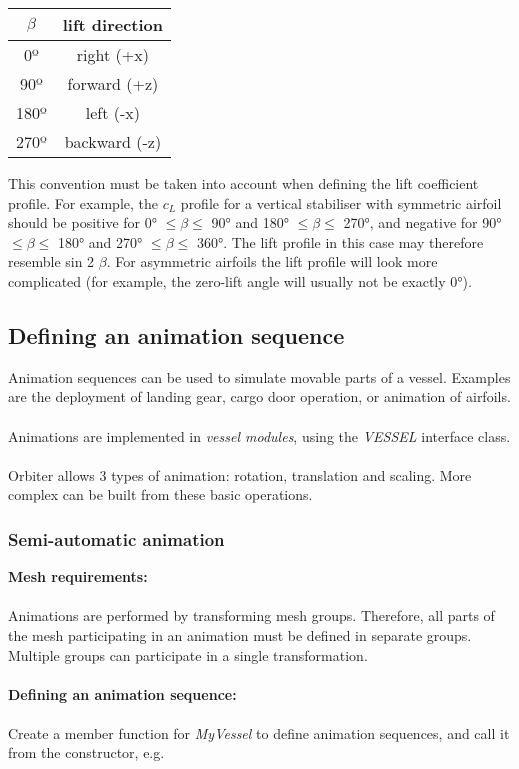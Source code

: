 \documentclass[Orbiter Developer Manual.tex]{subfiles}
\begin{document}
\begin{table}[H]
	\centering
	\begin{tabular}{ |c|c| }
	\hline\rule{0pt}{2ex}
	\textbf{$\beta$} & \textbf{lift direction} \\
	\hline\rule{0pt}{2ex}
	0º & right (+x)\\
	\hline\rule{0pt}{2ex}
	90º & forward (+z)\\
	\hline\rule{0pt}{2ex}
	180º & left (-x)\\
	\hline\rule{0pt}{2ex}
	270º & backward (-z)\\
	\hline
	\end{tabular}
\end{table}

\noindent
This convention must be taken into account when defining the lift coefficient profile. For example, the $c_{L}$ profile for a vertical stabiliser with symmetric airfoil should be positive for 0° $\leq \beta \leq$ 90° and 180° $\leq \beta \leq$ 270°, and negative for 90° $\leq \beta \leq$ 180° and 270° $\leq \beta \leq$ 360°. The lift profile in this case may therefore resemble sin 2 $\beta$. For asymmetric airfoils the lift profile will look more complicated (for example, the zero-lift angle will usually not be exactly 0°).


\subsection{Defining an animation sequence}
 \label{ssec:def_anim_sec}
Animation sequences can be used to simulate movable parts of a vessel. Examples are the deployment of landing gear, cargo door operation, or animation of airfoils.\\
\\
Animations are implemented in \textit{vessel modules}, using the \textit{VESSEL} interface class.\\
\\
Orbiter allows 3 types of animation: rotation, translation and scaling. More complex can be built from these basic operations.


\subsubsection{Semi-automatic animation}
\textbf{Mesh requirements:}\\
\\
Animations are performed by transforming mesh groups. Therefore, all parts of the mesh participating in an animation must be defined in separate groups. Multiple groups can participate in a single transformation.\\
\\
\textbf{Defining an animation sequence:}\\
\\
Create a member function for \textit{MyVessel} to define animation sequences, and call it from the constructor, e.g.
\end{document}
